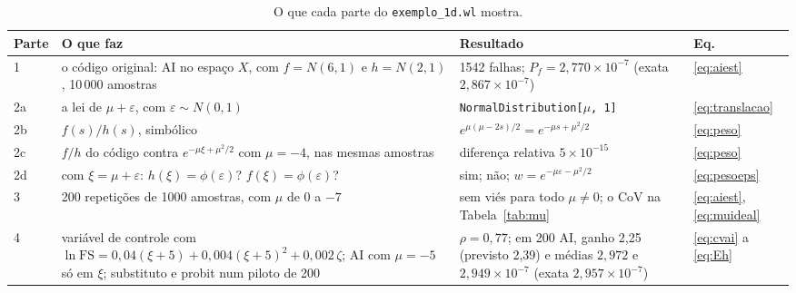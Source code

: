 \documentclass[11pt,a4paper]{article}
\newcommand{\FS}{\mathrm{FS}}
\begin{document}
\begin{table}[H]\centering\small
\caption{O que cada parte do \texttt{exemplo\_1d.wl} mostra.}\label{tab:exemplo}
\begin{tabular}{p{}p{}p{}p{}}
\toprule
Parte & O que faz & Resultado & Eq. \\
\midrule
1 & o código original: AI no espaço $X$, com $f = N(6, 1)$ e $h = N(2, 1)$, 10\,000 amostras & 1542 falhas;
  $P_f = 2{,}770\times10^{-7}$ (exata $2{,}867\times10^{-7}$) & \eqref{eq:aiest} \\
2a & a lei de $\mu + \varepsilon$, com $\varepsilon \sim N(0, 1)$ & \texttt{NormalDistribution[$\mu$, 1]} &
  \eqref{eq:translacao} \\
2b & $f(s)/h(s)$, simbólico & $e^{\mu(\mu - 2s)/2} = e^{-\mu s + \mu^2/2}$ & \eqref{eq:peso} \\
2c & $f/h$ do código contra $e^{-\mu\xi + \mu^2/2}$ com $\mu = -4$, nas mesmas amostras & diferença relativa
  $5\times10^{-15}$ & \eqref{eq:peso} \\
2d & com $\xi = \mu + \varepsilon$: $h(\xi) = \phi(\varepsilon)$? $f(\xi) = \phi(\varepsilon)$? & sim; não;
  $w = e^{-\mu\varepsilon - \mu^2/2}$ & \eqref{eq:pesoeps} \\
3 & 200 repetições de 1000 amostras, com $\mu$ de 0 a $-7$ & sem viés para todo $\mu \ne 0$; o CoV na
  Tabela~\ref{tab:mu} & \eqref{eq:aiest}, \eqref{eq:muideal} \\
4 & variável de controle com $\ln\FS = 0{,}04(\xi + 5) + 0{,}004(\xi + 5)^2 + 0{,}002\,\zeta$; AI com $\mu = -5$ só em
  $\xi$; substituto e probit num piloto de 200 & $\rho = 0{,}77$; em 200 AI, ganho 2,25 (previsto 2,39) e médias
  $2{,}972$ e $2{,}949\times10^{-7}$ (exata $2{,}957\times10^{-7}$) & \eqref{eq:cvai} a \eqref{eq:Eh} \\
\bottomrule
\end{tabular}
\end{table}
\end{document}
